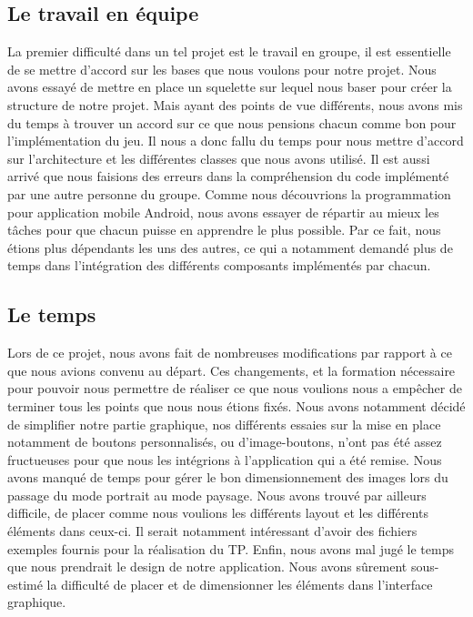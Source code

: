 \documentclass[12pt, a4paper]{article}%
\begin{document}
  \subsection{Le travail en équipe}
La premier difficulté dans un tel projet est le travail en groupe, il est essentielle de se mettre d'accord sur les bases que nous voulons pour notre projet. Nous avons essayé de mettre en place un squelette sur lequel nous baser pour créer la structure de notre projet. Mais ayant des points de vue différents, nous avons mis du temps à trouver un accord sur ce que nous pensions chacun comme bon pour l'implémentation du jeu. Il nous a donc fallu du temps pour nous mettre d'accord sur l'architecture et les différentes classes que nous avons utilisé. Il est aussi arrivé que nous faisions des erreurs dans la compréhension du code implémenté par une autre personne du groupe.
Comme nous découvrions la programmation pour application mobile Android, nous avons essayer de répartir au mieux les tâches pour que chacun puisse en apprendre le plus possible. Par ce fait, nous étions plus dépendants les uns des autres, ce qui a notamment demandé plus de temps dans l'intégration des différents composants implémentés par chacun. 

  \subsection{Le temps}
  Lors de ce projet, nous avons fait de nombreuses modifications par rapport à ce que nous avions convenu au départ. Ces changements, et la formation nécessaire pour pouvoir nous permettre de réaliser ce que nous voulions nous a empêcher de terminer tous les points que nous nous étions fixés. Nous avons notamment décidé de simplifier notre partie graphique, nos différents essaies sur la mise en place notamment de boutons personnalisés, ou d'image-boutons, n'ont pas été assez fructueuses pour que nous les intégrions à l'application qui a été remise. Nous avons manqué de temps pour gérer le bon dimensionnement des images lors du passage du mode portrait au mode paysage. 
  Nous avons trouvé par ailleurs difficile, de placer comme nous voulions les différents layout et les différents éléments dans ceux-ci. Il serait notamment intéressant d'avoir des fichiers exemples fournis pour la réalisation du TP. Enfin, nous avons mal jugé le temps que nous prendrait le design de notre application. Nous avons sûrement sous-estimé la difficulté de placer et de dimensionner les éléments dans l'interface graphique.
\end{document}
